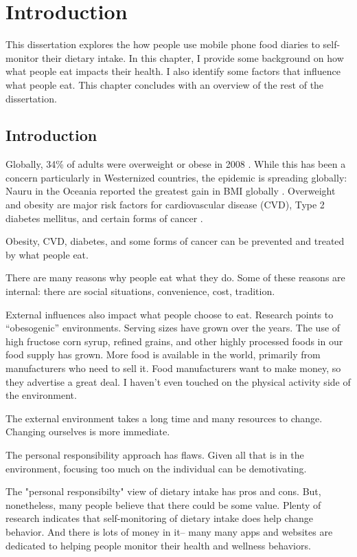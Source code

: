 \chapter {Introduction}

This dissertation explores the how people use mobile phone food diaries to self-monitor their dietary intake. In this chapter, I provide some background on how what people eat impacts their health. I also identify some factors that influence what people eat. This chapter concludes with an overview of the rest of the dissertation. 


\section{Introduction}
Globally, 34\% of adults were overweight or obese in 2008 \citep{kimokoti_diet_2011}. While this has been a concern particularly in Westernized countries, the epidemic is spreading globally: Nauru in the Oceania reported the greatest gain in BMI globally \citep{finucane_national_2011}. Overweight and obesity are major risk factors for cardiovascular disease (CVD), Type 2 diabetes mellitus, and certain forms of cancer \citep{guh_incidence_2009} \citep{calle_overweight_2004}. 

Obesity, CVD, diabetes, and some forms of cancer can be prevented and treated by what people eat. 

There are many reasons why people eat what they do. Some of these reasons are internal: there are social situations, convenience, cost, tradition. 

External influences also impact what people choose to eat. Research points to ``obesogenic'' environments. Serving sizes have grown over the years. The use of high fructose corn syrup, refined grains, and other highly processed foods in our food supply has grown. More food is available in the world, primarily from manufacturers who need to sell it. Food manufacturers want to make money, so they advertise a great deal. I haven't even touched on the physical activity side of the environment. 

The external environment takes a long time and many resources to change. Changing ourselves is more immediate. 

The personal responsibility approach has flaws. Given all that is in the environment, focusing too much on the individual can be demotivating. 

The "personal responsibilty" view of dietary intake has pros and cons. But, nonetheless, many people believe that there could be some value. Plenty of research indicates that self-monitoring of dietary intake does help change behavior. And there is lots of money in it-- many many apps and websites are dedicated to helping people monitor their health and wellness behaviors. 

